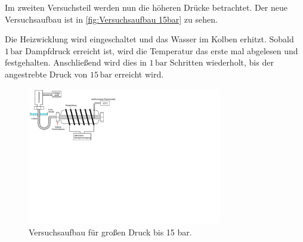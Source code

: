 Im zweiten Versuchsteil werden nun die höheren Drücke betrachtet.
Der neue Versuchsaufbau ist in \autoref{fig:Versuchsaufbau 15bar} zu sehen.

Die Heizwicklung wird eingeschaltet und das Wasser im Kolben erhitzt.
Sobald $1\,\unit{\bar}$ Dampfdruck erreicht ist, wird die Temperatur das erste mal abgelesen und festgehalten.
Anschließend wird dies in $1\,\unit{\bar}$ Schritten wiederholt, bis der angestrebte Druck
von $15\,\unit{\bar}$ erreicht wird.

\begin{figure} [H]
    \centering
    \includegraphics[height=6cm]{content/Bilder/Versuchsaufbau_15bar.pdf}
    \caption{Versuchsaufbau für großen Druck bis 15 bar. \cite{v203}}
    \label{fig:Versuchsaufbau 15bar}
\end{figure}